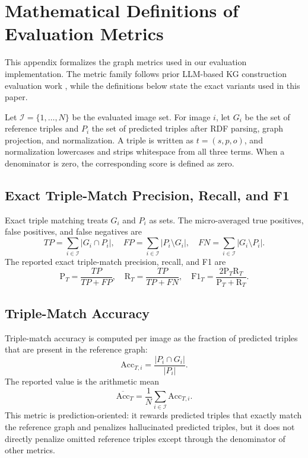 \documentclass[preprint,12pt]{elsarticle}
\begin{document}
\section{Mathematical Definitions of Evaluation Metrics}\label{app:metric_definitions}

This appendix formalizes the graph metrics used in our evaluation implementation. The metric family follows prior LLM-based KG construction evaluation work \citep{ghanemcruz2025kgc}, while the definitions below state the exact variants used in this paper.

Let $\mathcal{I}=\{1,\ldots,N\}$ be the evaluated image set. For image $i$, let $G_i$ be the set of reference triples and $P_i$ the set of predicted triples after RDF parsing, graph projection, and normalization. A triple is written as $t=(s,p,o)$, and normalization lowercases and strips whitespace from all three terms. When a denominator is zero, the corresponding score is defined as zero.

\subsection{Exact Triple-Match Precision, Recall, and F1}
Exact triple matching treats $G_i$ and $P_i$ as sets. The micro-averaged true positives, false positives, and false negatives are
\[
TP=\sum_{i\in\mathcal{I}} |G_i\cap P_i|,\quad
FP=\sum_{i\in\mathcal{I}} |P_i\setminus G_i|,\quad
FN=\sum_{i\in\mathcal{I}} |G_i\setminus P_i|.
\]
The reported exact triple-match precision, recall, and F1 are
\[
\mathrm{P}_{T}=\frac{TP}{TP+FP},\quad
\mathrm{R}_{T}=\frac{TP}{TP+FN},\quad
\mathrm{F1}_{T}=\frac{2\mathrm{P}_{T}\mathrm{R}_{T}}{\mathrm{P}_{T}+\mathrm{R}_{T}}.
\]

\subsection{Triple-Match Accuracy}
Triple-match accuracy is computed per image as the fraction of predicted triples that are present in the reference graph:
\[
\mathrm{Acc}_{T,i}=\frac{|P_i\cap G_i|}{|P_i|}.
\]
The reported value is the arithmetic mean
\[
\overline{\mathrm{Acc}}_{T}=\frac{1}{N}\sum_{i\in\mathcal{I}}\mathrm{Acc}_{T,i}.
\]
This metric is prediction-oriented: it rewards predicted triples that exactly match the reference graph and penalizes hallucinated predicted triples, but it does not directly penalize omitted reference triples except through the denominator of other metrics.
\end{document}
